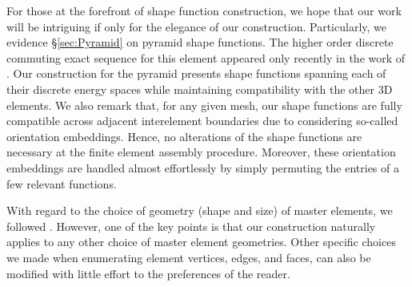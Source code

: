 For those at the forefront of shape function construction, we hope that our work will be intriguing if only for the elegance of our construction.
Particularly, we evidence \S\ref{sec:Pyramid} on pyramid shape functions.
The higher order discrete commuting exact sequence for this element appeared only recently in the work of \citet{Nigam_Phillips_11}.
Our construction for the pyramid presents shape functions spanning each of their discrete energy spaces while maintaining compatibility with the other 3D elements.
We also remark that, for any given mesh, our shape functions are fully compatible across adjacent interelement boundaries due to considering so-called orientation embeddings.
Hence, no alterations of the shape functions are necessary at the finite element assembly procedure.
Moreover, these orientation embeddings are handled almost effortlessly by simply permuting the entries of a few relevant functions.

With regard to the choice of geometry (shape and size) of master elements, we followed \citet{hpbook}.
However, one of the key points is that our construction naturally applies to any other choice of master element geometries.
Other specific choices we made when enumerating element vertices, edges, and faces, can also be modified with little effort to the preferences of the reader.

